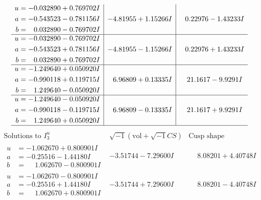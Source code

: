 \documentclass[1p]{elsarticle_modified}
\theoremstyle{definition}
\newcommand{\I}{\sqrt{-1}}
\begin{document}
$$\begin{array}{c|c|c}
\begin{aligned}
u &= -0.032890 + 0.769702 I \\
a &= -0.543523 - 0.781156 I \\
b &= \phantom{-}0.032890 - 0.769702 I\end{aligned}
 & -4.81955 + 1.15266 I & \phantom{-}0.22976 - 1.43233 I \\ \hline\begin{aligned}
u &= -0.032890 - 0.769702 I \\
a &= -0.543523 + 0.781156 I \\
b &= \phantom{-}0.032890 + 0.769702 I\end{aligned}
 & -4.81955 - 1.15266 I & \phantom{-}0.22976 + 1.43233 I \\ \hline\begin{aligned}
u &= -1.249640 + 0.050920 I \\
a &= -0.990118 + 0.119715 I \\
b &= \phantom{-}1.249640 - 0.050920 I\end{aligned}
 & \phantom{-}6.96809 + 0.13335 I & \phantom{-}21.1617 - 9.9291 I \\ \hline\begin{aligned}
u &= -1.249640 - 0.050920 I \\
a &= -0.990118 - 0.119715 I \\
b &= \phantom{-}1.249640 + 0.050920 I\end{aligned}
 & \phantom{-}6.96809 - 0.13335 I & \phantom{-}21.1617 + 9.9291 I\\
 \hline 
 \end{array}$$\newpage$$\begin{array}{c|c|c}  
\text{Solutions to }I^u_{3}& \I (\text{vol} + \sqrt{-1}CS) & \text{Cusp shape}\\
 \hline 
\begin{aligned}
u &= -1.062670 + 0.800901 I \\
a &= -0.25516 - 1.44180 I \\
b &= \phantom{-}1.062670 - 0.800901 I\end{aligned}
 & -3.51744 - 7.29600 I & \phantom{-}8.08201 + 4.40748 I \\ \hline\begin{aligned}
u &= -1.062670 - 0.800901 I \\
a &= -0.25516 + 1.44180 I \\
b &= \phantom{-}1.062670 + 0.800901 I\end{aligned}
 & -3.51744 + 7.29600 I & \phantom{-}8.08201 - 4.40748 I \\ \hline\begin{aligned}

\end{aligned}
\end{array}$$
\end{document}
